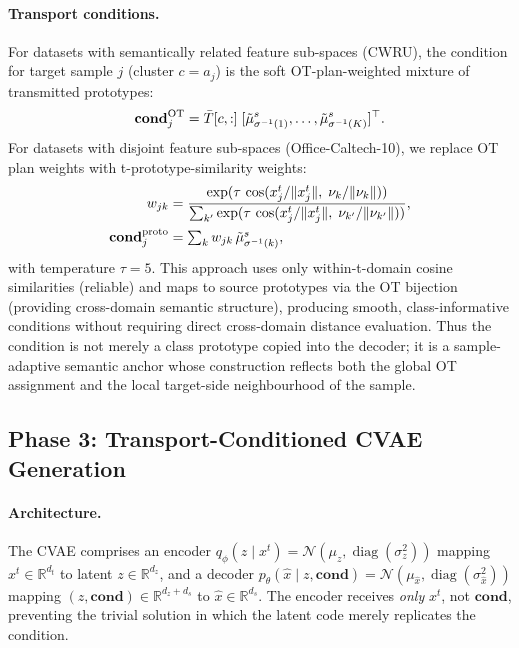 \documentclass[a4paper,fleqn]{cas-sc}
\begin{document}
\paragraph{Transport conditions.}
For datasets with semantically related feature sub-spaces (CWRU), the
condition for target sample $j$ (cluster $c = a_j$) is the soft
OT-plan-weighted mixture of transmitted prototypes:
\begin{equation}
  \mathbf{cond}_j^{\rm OT} = \bar T[c,:]\;
    [\tilde\mu_{\sigma^{-1}(1)}^s, \ldots, \tilde\mu_{\sigma^{-1}(K)}^s]^\top.
  \label{eq:otcond}
\end{equation}
For datasets with disjoint feature sub-spaces (Office-Caltech-10), we
replace OT plan weights with t-prototype-similarity weights:
\begin{align}
  w_{jk} &= \frac{\exp(\tau\,\cos(x_j^t/\|x_j^t\|,\;\nu_k/\|\nu_k\|))}
                  {\sum_{k'}\exp(\tau\,\cos(x_j^t/\|x_j^t\|,\;\nu_{k'}/\|\nu_{k'}\|))},
  \label{eq:protocond_w}\\
  \mathbf{cond}_j^{\rm proto} &= \textstyle\sum_{k} w_{jk}\,\tilde\mu_{\sigma^{-1}(k)}^s,
  \label{eq:protocond}
\end{align}
with temperature $\tau=5$.
This approach uses only within-t-domain cosine similarities (reliable)
and maps to source prototypes via the OT bijection (providing cross-domain
semantic structure), producing smooth, class-informative conditions without
requiring direct cross-domain distance evaluation.
Thus the condition is not merely a class prototype copied into the decoder;
it is a sample-adaptive semantic anchor whose construction reflects both the
global OT assignment and the local target-side neighbourhood of the sample.

\subsection{Phase 3: Transport-Conditioned CVAE Generation}
\label{sec:phase3}

\paragraph{Architecture.}
The CVAE comprises an encoder
$q_\phi(z \mid x^t) = \mathcal{N}(\mu_z, \operatorname{diag}(\sigma_z^2))$
mapping $x^t \in \mathbb{R}^{d_t}$ to latent $z \in \mathbb{R}^{d_z}$,
and a decoder
$p_\theta(\hat x \mid z, \mathbf{cond}) = \mathcal{N}(\mu_{\hat x},
\operatorname{diag}(\sigma_{\hat x}^2))$
mapping $(z, \mathbf{cond}) \in \mathbb{R}^{d_z+d_s}$ to
$\hat x \in \mathbb{R}^{d_s}$.
The encoder receives \emph{only} $x^t$, not $\mathbf{cond}$, preventing
the trivial solution in which the latent code merely replicates the
condition.
\end{document}
